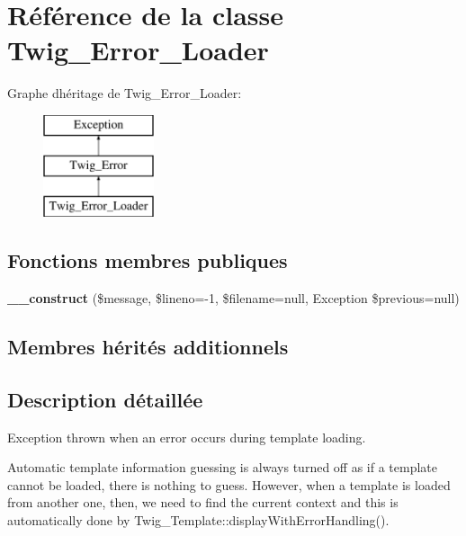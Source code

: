 \hypertarget{class_twig___error___loader}{}\section{Référence de la classe Twig\+\_\+\+Error\+\_\+\+Loader}
\label{class_twig___error___loader}
Graphe d\textquotesingle{}héritage de Twig\+\_\+\+Error\+\_\+\+Loader\+:\begin{figure}[H]
\begin{center}
\leavevmode
\includegraphics[height=3.000000cm]{class_twig___error___loader}
\end{center}
\end{figure}
\subsection*{Fonctions membres publiques}
\begin{DoxyCompactItemize}
\item 
{\bfseries \+\_\+\+\_\+construct} (\$message, \$lineno=-\/1, \$filename=null, Exception \$previous=null)\hypertarget{class_twig___error___loader_a61443b1ca6c32f74ff85c2fd550110cf}{}\label{class_twig___error___loader_a61443b1ca6c32f74ff85c2fd550110cf}

\end{DoxyCompactItemize}
\subsection*{Membres hérités additionnels}


\subsection{Description détaillée}
Exception thrown when an error occurs during template loading.

Automatic template information guessing is always turned off as if a template cannot be loaded, there is nothing to guess. However, when a template is loaded from another one, then, we need to find the current context and this is automatically done by Twig\+\_\+\+Template\+::display\+With\+Error\+Handling().


